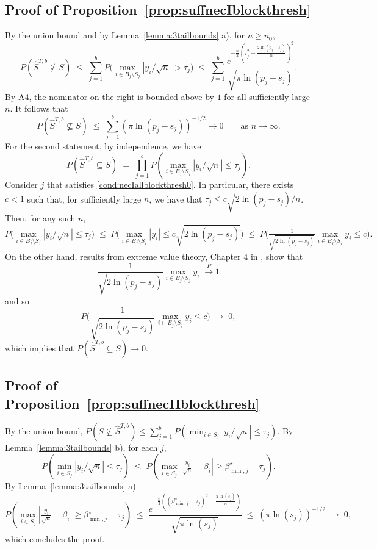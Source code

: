 \documentclass[aos]{imsart}
\theoremstyle{plain}
\begin{document}
\begin{supplement}
\subsection{Proof of Proposition~\ref{prop:suffnecIblockthresh}} By the union bound and by Lemma~\ref{lemma:3tailbounds} a), for $n\geq n_0$, \begin{equation*}
P\left(\hat{S}^{T,b} \not\subseteq S\right)\;\leq\; \sum_{j=1}^b P\Big(\max_{i\in B_j\setminus S_j}|y_i/\sqrt{n}|>\tau_{j}\Big)\;\leq\;\sum_{j=1}^b\frac{e^{-\tfrac{n}{2}\left(\tau_j^2-\tfrac{2\ln(p_j-s_j)}{n}\right)^2}}{\sqrt{\pi\ln(p_j-s_j)}} 	.
 \end{equation*}
 By A4, the nominator on the right is bounded above by $1$ for all sufficiently large $n$. It follows that 
	$$P\left(\hat{S}^{T,b} \not\subseteq S\right) \;\leq\; \sum_{j=1}^b (\pi\ln (p_j-s_j))^{-1/2} \to 0\qquad \mbox{as } n\to \infty.$$
For the second statement, by independence, we have 
$$P(\hat{S}^{T,b} \subseteq S)\;=\;\prod_{j=1}^b P(\max_{i \in B_j\setminus S_j}|y_i/\sqrt{n}| \leq \tau_j).$$ 
Consider $j$ that satisfies \eqref{cond:necIallblockthresh0}. In particular, there exists $c<1$ such that, for sufficiently large $n$, we have that $\tau_j\leq c\sqrt{2\ln(p_j-s_j)/n}$. Then, for any such $n$,
$$
P\Big(\max_{i \in B_j\setminus S_j}|y_i/\sqrt{n}| \leq \tau_j\Big)\;\leq\; P\Big(\max_{i \in B_j\setminus S_j}|y_i| \leq c \sqrt{2\ln(p_j-s_j)}\Big)\;\leq\;P\Big(\tfrac{1}{\sqrt{2\ln(p_j-s_j)}}\max_{i \in B_j\setminus S_j}y_i \leq c \Big).
$$
On the other hand, results from extreme value theory, Chapter 4 in \cite{galambos}, show that 
 $$\frac{1}{\sqrt{2 \ln(p_j-s_j)}}\max_{i\in B_j\setminus S_j}y_i \;\overset{P}{\longrightarrow} 1$$
 and so 
 $$
 P\Big(\frac{1}{\sqrt{2\ln(p_j-s_j)}}\max_{i \in B_j\setminus S_j}y_i \leq c \Big)\;\to\;0,
 $$ 
 which implies that $P(\hat{S}^{T,b} \subseteq S)\to 0$. 

\subsection{Proof of Proposition~\ref{prop:suffnecIIblockthresh}}
	 By the union bound, 
	$P\left(S \not\subseteq \hat{S}^{T,b}\right)\leq \sum_{j=1}^b  P\left(\min_{i\in S_j}|y_i/\sqrt{n}|\leq\tau_j\right)$. 
	By Lemma~\ref{lemma:3tailbounds} b), for each $j$,	
	$$P\left(\min_{i\in S_j}|y_i/\sqrt{n}|\leq\tau_j\right)\;\leq\; P\left(\max_{i\in S_j}|\tfrac{y_i}{\sqrt{n}}-\beta_i| \geq\beta_{\min,j}^{\star}-\tau_j \right).$$ By Lemma~\ref{lemma:3tailbounds} a)  
	\begin{equation}\label{eq:rate2}
P\left(\max_{i\in S_j}|\tfrac{y_i}{\sqrt{n}}-\beta_i| \geq\beta_{\min,j}^{\star}-\tau_j \right) \;\leq\;\frac{e^{-\tfrac{n}{2}\left((\beta^\star_{\min,j}-\tau_j)^2-\tfrac{2\ln(s_j)}{n}\right)}}{\sqrt{\pi\ln(s_j)}}\;\leq\; (\pi\ln (s_j))^{-1/2}\;\to\;0,		
	\end{equation}
	which concludes the proof. 


\end{supplement}
\end{document}
